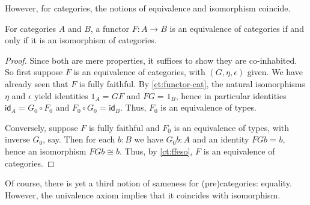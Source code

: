 \documentclass{amsart}
\newcommand{\id}[3][]{\ensuremath{#2 =_{#1} #3}\xspace}
\newcommand{\idfunc}[1][]{\ensuremath{\mathsf{id}_{#1}}\xspace}
\theoremstyle{definition}
\theoremstyle{remark}
\numberwithin{equation}{section}
\begin{document}
However, for categories, the notions of equivalence and isomorphism coincide.

\begin{lem}\label{ct:eqv-levelwise}
  For categories $A$ and $B$, a functor $F:A\to B$ is an equivalence of categories if and only if it is an isomorphism of categories.
\end{lem}
\begin{proof}
  Since both are mere properties, it suffices to show they are co-inhabited.
  So first suppose $F$ is an equivalence of categories, with $(G,\eta,\epsilon)$ given.
  We have already seen that $F$ is fully faithful.
  By \autoref{ct:functor-cat}, the natural isomorphisms $\eta$ and $\epsilon$ yield identities $\id{1_A}{GF}$ and $\id{FG}{1_B}$, hence in particular identities $\id{\idfunc[A]}{G_0\circ F_0}$ and $\id{F_0\circ G_0}{\idfunc[B]}$.
Thus, $F_0$ is an equivalence of types.

  Conversely, suppose $F$ is fully faithful and $F_0$ is an equivalence of types, with inverse $G_0$, say.
  Then for each $b:B$ we have $G_0 b:A$ and an identity $\id{FGb}{b}$, hence an isomorphism $FGb\cong b$.
  Thus, by \autoref{ct:ffeso}, $F$ is an equivalence of categories.
\end{proof}

Of course, there is yet a third notion of sameness for (pre)categories: equality.
However, the univalence axiom implies that it coincides with isomorphism.
\end{document}
